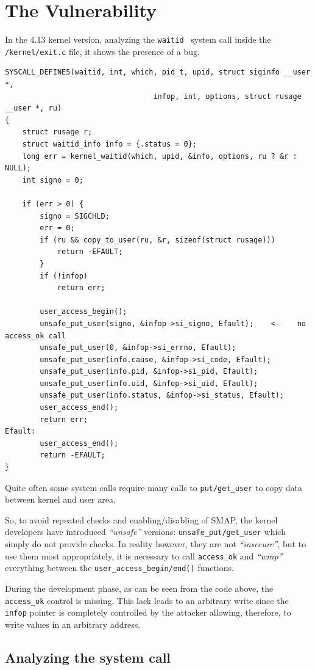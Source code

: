 \documentclass{masterthesis}
\begin{document}
\section{The Vulnerability}
\label{sect:vulnerability_17}
In the 4.13 kernel version, analyzing the \texttt{waitid}~\cite{waitid} system call inside the \texttt{/kernel/exit.c} file, it shows the presence of a bug.
\begin{lstlisting}
SYSCALL_DEFINE5(waitid, int, which, pid_t, upid, struct siginfo __user *,
                                  infop, int, options, struct rusage __user *, ru)
{
    struct rusage r;
    struct waitid_info info = {.status = 0};
    long err = kernel_waitid(which, upid, &info, options, ru ? &r : NULL);
    int signo = 0;

    if (err > 0) {
        signo = SIGCHLD;
        err = 0;
        if (ru && copy_to_user(ru, &r, sizeof(struct rusage)))
            return -EFAULT;
        }
        if (!infop)
            return err;

        user_access_begin();
        unsafe_put_user(signo, &infop->si_signo, Efault);    <-    no access_ok call
        unsafe_put_user(0, &infop->si_errno, Efault);
        unsafe_put_user(info.cause, &infop->si_code, Efault);
        unsafe_put_user(info.pid, &infop->si_pid, Efault);
        unsafe_put_user(info.uid, &infop->si_uid, Efault);
        unsafe_put_user(info.status, &infop->si_status, Efault);
        user_access_end();
        return err;
Efault:
        user_access_end();
        return -EFAULT;
}
\end{lstlisting}
Quite often some system calls require many calls to \texttt{put/get_user} to copy data between kernel and user area.

So, to avoid repeated checks and enabling/disabling of SMAP, the kernel developers have introduced \emph{``unsafe''} versions: \texttt{unsafe_put/get_user} which simply do not provide checks.
In reality however, they are not \emph{``insecure''}, but to use them most appropriately, it is necessary to call \texttt{access\_ok} and \emph{``wrap''} everything between the \texttt{user\_access\_begin/end()} functions.


During the development phase, as can be seen from the code above, the \texttt{access_ok} control is missing.
This lack leads to an arbitrary write since the \texttt{infop} pointer is completely controlled by the attacker allowing, therefore, to write values in an arbitrary address.

\subsection{Analyzing the system call}
\label{subsect:waitid}
\end{document}
